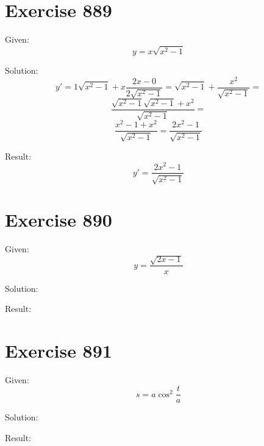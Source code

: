 \documentclass[a4paper, 10pt]{scrartcl}
\begin{document}
\section{Exercise 889}

Given:
\[
y = x\sqrt{x^{2} - 1}
\]

Solution:
\[
y' = 1\sqrt{x^{2} - 1} + x\frac{2x - 0}{2\sqrt{x^{2} - 1}} = \sqrt{x^{2} - 1} + \frac{x^{2}}{\sqrt{x^{2} - 1}} =
\]
\[
\frac{\sqrt{x^{2} - 1}\sqrt{x^{2} - 1} + x^{2}}{\sqrt{x^{2} - 1}} =
\]
\[
\frac{x^{2} - 1 + x^{2}}{\sqrt{x^{2} - 1}} = \frac{2x^{2} - 1}{\sqrt{x^{2} - 1}}
\]

Result:
\[
y' = \frac{2x^{2} - 1}{\sqrt{x^{2} - 1}}
\]

\section{Exercise 890}

Given:
\[
y = \frac{\sqrt{2x - 1}}{x}
\]

Solution:

Result:

\section{Exercise 891}

Given:
\[
s = a\cos^{2}{\frac{t}{a}}
\]

Solution:

Result:
\end{document}

